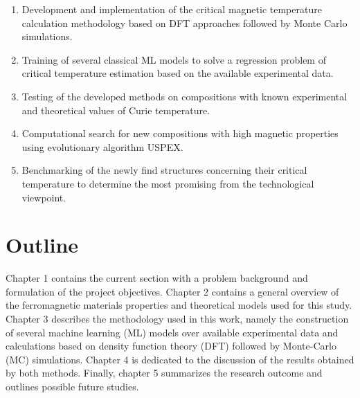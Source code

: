 \begin{enumerate}
\item Development and implementation of the critical magnetic temperature calculation methodology based on DFT approaches followed by Monte Carlo simulations.
\item Training of several classical ML models to solve a regression problem of critical temperature estimation based on the available experimental data.
\item Testing of the developed methods on compositions with known experimental and theoretical values of Curie temperature.
\item Computational search for new compositions with high magnetic properties using evolutionary algorithm USPEX.
\item Benchmarking of the newly find structures concerning their critical temperature to
determine the most promising from the technological viewpoint.
\end{enumerate}

\section{Outline}

Chapter 1 contains the current section with a problem background and formulation of the project objectives. Chapter 2 contains a general overview of the ferromagnetic materials properties and theoretical models used for this study. Chapter 3 describes the methodology used in this work, namely the construction of several machine learning (ML) models over available experimental data and calculations based on density function theory (DFT) followed by Monte-Carlo (MC) simulations. Chapter 4 is dedicated to the discussion of the results obtained by both methods. Finally, chapter 5 summarizes the research outcome and outlines possible future studies.




